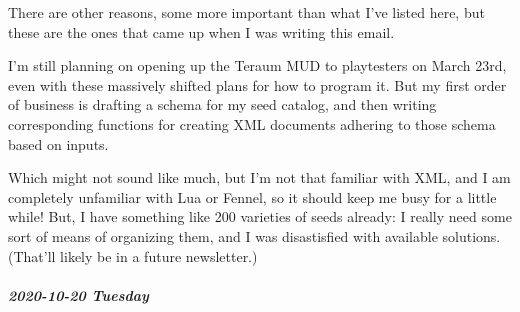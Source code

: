 \documentclass[11pt]{article}
\begin{document}
\begin{itemize}
There are other reasons, some more important than what I’ve listed here, but these are the ones that came up when I was writing this email.

I’m still planning on opening up the Teraum MUD to playtesters on March 23rd, even with these massively shifted plans for how to program it. But my first order of business is drafting a schema for my seed catalog, and then writing corresponding functions for creating XML documents adhering to those schema based on inputs.

Which might not sound like much, but I’m not that familiar with XML, and I am completely unfamiliar with Lua or Fennel, so it should keep me busy for a little while! But, I have something like 200 varieties of seeds already: I really need some sort of means of organizing them, and I was disastisfied with available solutions. (That’ll likely be in a future newsletter.)
\end{itemize}
\subparagraph*{2020-10-20 Tuesday}
\label{sec:org8df88a7}
\end{document}
